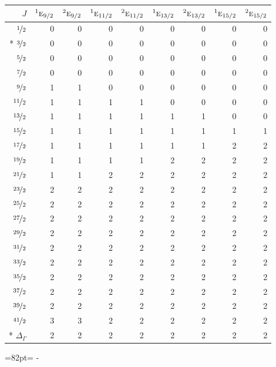 \documentclass[10pt,a4paper]{article}
\makeatletter
\def\grouprule#1#2{\noalign{\marks\LTgroupmarks{\the\belowrulesep}\nobreak\vskip#1%
  \vskip\aboverulesep}\multispan\LT@cols\unskip{\leaders\hrule\@height#2\hfill\kern\z@}\cr
  \noalign{\penalty\LTrulebreak\vskip\belowrulesep\global\@lastruleclass\z@}}
\newcommand{\needspace}[1]{\par\penalty-100\begingroup\dimen0=#1\relax\dimen2=\pagegoal
  \advance\dimen2-\pagetotal\ifdim\dimen0>\dimen2\relax\ifdim\dimen2>0pt\vfil\break\fi\fi
  \endgroup}
\numberwithin{equation}{section}
\newcommand{\irr}[1]{\text{\normalfont\scshape #1}}
\newcommand{\conjpair}[1]{{}^{#1}}
\makeatother
\begin{document}
{\small\begin{longtable}{@{}rrrrrrrrr@{}}\toprule
$J$ & $\conjpair{1}\irr{e}_{9/2}$ & $\conjpair{2}\irr{e}_{9/2}$ & $\conjpair{1}\irr{e}_{11/2}$ & $\conjpair{2}\irr{e}_{11/2}$ & $\conjpair{1}\irr{e}_{13/2}$ & $\conjpair{2}\irr{e}_{13/2}$ & $\conjpair{1}\irr{e}_{15/2}$ & $\conjpair{2}\irr{e}_{15/2}$\\\midrule\endhead
\bottomrule\endfoot\endlastfoot
$\nicefrac{1}{2}$ & 0 & 0 & 0 & 0 & 0 & 0 & 0 & 0\\*
$\nicefrac{3}{2}$ & 0 & 0 & 0 & 0 & 0 & 0 & 0 & 0\\
$\nicefrac{5}{2}$ & 0 & 0 & 0 & 0 & 0 & 0 & 0 & 0\\
$\nicefrac{7}{2}$ & 0 & 0 & 0 & 0 & 0 & 0 & 0 & 0\\
$\nicefrac{9}{2}$ & 1 & 1 & 0 & 0 & 0 & 0 & 0 & 0\\
$\nicefrac{11}{2}$ & 1 & 1 & 1 & 1 & 0 & 0 & 0 & 0\\
$\nicefrac{13}{2}$ & 1 & 1 & 1 & 1 & 1 & 1 & 0 & 0\\
$\nicefrac{15}{2}$ & 1 & 1 & 1 & 1 & 1 & 1 & 1 & 1\\
$\nicefrac{17}{2}$ & 1 & 1 & 1 & 1 & 1 & 1 & 2 & 2\\
$\nicefrac{19}{2}$ & 1 & 1 & 1 & 1 & 2 & 2 & 2 & 2\\
$\nicefrac{21}{2}$ & 1 & 1 & 2 & 2 & 2 & 2 & 2 & 2\\
$\nicefrac{23}{2}$ & 2 & 2 & 2 & 2 & 2 & 2 & 2 & 2\\
$\nicefrac{25}{2}$ & 2 & 2 & 2 & 2 & 2 & 2 & 2 & 2\\
$\nicefrac{27}{2}$ & 2 & 2 & 2 & 2 & 2 & 2 & 2 & 2\\
$\nicefrac{29}{2}$ & 2 & 2 & 2 & 2 & 2 & 2 & 2 & 2\\
$\nicefrac{31}{2}$ & 2 & 2 & 2 & 2 & 2 & 2 & 2 & 2\\
$\nicefrac{33}{2}$ & 2 & 2 & 2 & 2 & 2 & 2 & 2 & 2\\
$\nicefrac{35}{2}$ & 2 & 2 & 2 & 2 & 2 & 2 & 2 & 2\\
$\nicefrac{37}{2}$ & 2 & 2 & 2 & 2 & 2 & 2 & 2 & 2\\
$\nicefrac{39}{2}$ & 2 & 2 & 2 & 2 & 2 & 2 & 2 & 2\\
$\nicefrac{41}{2}$ & 3 & 3 & 2 & 2 & 2 & 2 & 2 & 2\\*
\grouprule{0pt}{\lightrulewidth} $\Delta_\Gamma$ & 2 & 2 & 2 & 2 & 2 & 2 & 2 & 2\\
\bottomrule\end{longtable}}
\needspace{82pt}
\end{document}

